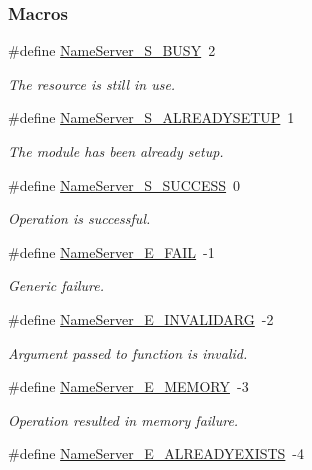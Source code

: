 \subsubsection*{Macros}
\begin{DoxyCompactItemize}
\item 
\#define \hyperlink{_name_server_8h_a57542b4fd6b5d46d78064ae92215bc4b}{Name\-Server\-\_\-\-S\-\_\-\-B\-U\-S\-Y}~2
\begin{DoxyCompactList}\small\item\em The resource is still in use. \end{DoxyCompactList}\item 
\#define \hyperlink{_name_server_8h_a66224beb4a7f1cc92923a8fe630429ce}{Name\-Server\-\_\-\-S\-\_\-\-A\-L\-R\-E\-A\-D\-Y\-S\-E\-T\-U\-P}~1
\begin{DoxyCompactList}\small\item\em The module has been already setup. \end{DoxyCompactList}\item 
\#define \hyperlink{_name_server_8h_a49cbe5edf8e519b17e323d01431e8161}{Name\-Server\-\_\-\-S\-\_\-\-S\-U\-C\-C\-E\-S\-S}~0
\begin{DoxyCompactList}\small\item\em Operation is successful. \end{DoxyCompactList}\item 
\#define \hyperlink{_name_server_8h_a2ffd6887c6aca49d73982fb226db679c}{Name\-Server\-\_\-\-E\-\_\-\-F\-A\-I\-L}~-\/1
\begin{DoxyCompactList}\small\item\em Generic failure. \end{DoxyCompactList}\item 
\#define \hyperlink{_name_server_8h_a213957efe13b0c8ec3d52e31a708b56f}{Name\-Server\-\_\-\-E\-\_\-\-I\-N\-V\-A\-L\-I\-D\-A\-R\-G}~-\/2
\begin{DoxyCompactList}\small\item\em Argument passed to function is invalid. \end{DoxyCompactList}\item 
\#define \hyperlink{_name_server_8h_a917b53c5df7ca0d6ecdc29c269fa0c2c}{Name\-Server\-\_\-\-E\-\_\-\-M\-E\-M\-O\-R\-Y}~-\/3
\begin{DoxyCompactList}\small\item\em Operation resulted in memory failure. \end{DoxyCompactList}\item 
\#define \hyperlink{_name_server_8h_ac52dae450ec3de45caa3ce1fe143b46e}{Name\-Server\-\_\-\-E\-\_\-\-A\-L\-R\-E\-A\-D\-Y\-E\-X\-I\-S\-T\-S}~-\/4

\end{DoxyCompactItemize}
